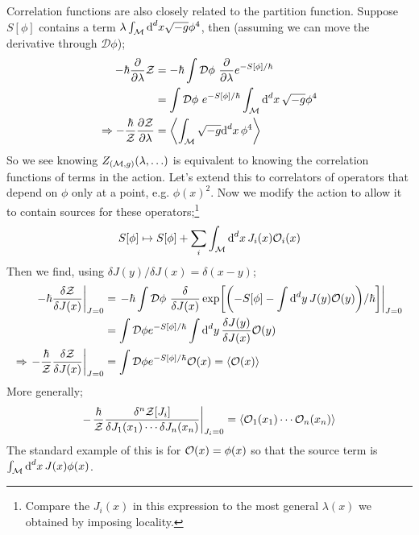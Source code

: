 \paraskip
Correlation functions are also closely related to the partition function. Suppose $S[\phi]$ contains a term $\lambda \int_{\mathcal{M}}{\text{d}^d x\sqrt{-g}\phi^4}$, then (assuming we can move the derivative through $\mathcal{D} \phi$);
\begin{align*}
-\hbar \frac{\del}{\del \lambda}\mZ &= -\hbar \int{\mD\phi \,\,\frac{\del}{\del \lambda}e^{-S[\phi]/\hbar}} \\
&=\int{\mD\phi \,\, e^{-S[\phi]/\hbar}\int_{\mM}{\upd{^d x}\sqrt{-g}\phi^4}} \\
\Rightarrow -\frac{\hbar}{\mZ}\frac{\del \mZ}{\del \lambda} &= \left< \int_{\mM}{\sqrt{-g}\upd{^d x}\phi^4} \right>
\end{align*}
So we see knowing $Z_{(\mathcal{M}, g)}(\lambda, \ldots)$ is equivalent to knowing the correlation functions of terms in the action. Let's extend this to correlators of operators that depend on $\phi$ only at a point, e.g. $\phi(x)^2$. Now we modify the action to allow it to contain sources for these operators;\footnote{Compare the $J_i(x)$ in this expression to the most general $\lambda(x)$ we obtained by imposing locality.}
\begin{equation}
S[\phi] \mapsto S[\phi] + \sum_{i}{\int_{\mathcal{M}}{\text{d}^d x \, J_i(x)\mathcal{O}_i(x)}}
\end{equation}
Then we find, using $\delta J(y)/\delta J(x) = \delta(x - y)$;
\begin{align*}
\left.-\hbar\frac{\delta \mZ}{\delta J(x)}\right|_{J = 0} &= \left.-\hbar\int{\mD\phi\,\,\frac{\delta}{\delta J(x)}\exp\left[\left(-S[\phi] - \int{\upd{^d y}J(y)\mO(y)}\right)/\hbar\right]}\right|_{J = 0} \\
&= \int{\mD\phi e^{-S[\phi]/\hbar}\int{\upd{^d y}\frac{\delta J(y)}{\delta J(x)}\mO(y)}} \\
\Rightarrow \left.-\frac{\hbar}{\mZ}\frac{\delta \mZ}{\delta J(x)}\right|_{J=0} &= \int{\mD\phi e^{-S[\phi]/\hbar}\mO(x)} = \left< \mO(x) \right>
\end{align*}
More generally;
\begin{equation}
-\left.\frac{\hbar}{\mZ}\frac{\delta^n \mZ[J_i]}{\delta J_1(x_1)\cdots \delta J_n(x_n)}\right|_{J_i = 0} = \left< \mO_1(x_1)\cdots\mO_n(x_n) \right>
\end{equation}
The standard example of this is for $\mathcal{O}(x) = \phi(x)$ so that the source term is $\int_{\mathcal{M}}{\text{d}^d x \,J(x)\phi(x)}$. 
